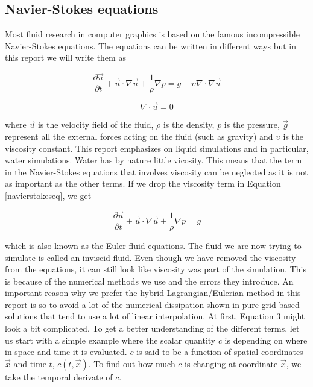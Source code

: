 \subsection{Navier-Stokes equations}

Most fluid research in computer graphics is based on the famous incompressible Navier-Stokes equations. The equations can be written in different ways but in this report we will write them as

\begin{equation}
\frac{\partial \vec{u}}{\partial t} + \vec{u} \cdot \nabla \vec{u} + \frac{1}{\rho}\nabla p = g + \upsilon \nabla \cdot \nabla \vec{u}
\label{navierstokeseq}
\end{equation}

\begin{equation}
\nabla \cdot \vec{u} = 0
\label{incompeq}
\end {equation}

where $\vec{u}$ is the velocity field of the fluid, $\rho$ is the density, $p$ is the pressure, $\vec{g}$ represent all the external forces acting on the fluid (such as gravity) and $\upsilon$ is the viscosity constant. This report emphasizes on liquid simulations and in particular, water simulations. Water has by nature little vicosity. This means that the term in the Navier-Stokes equations that involves viscosity can be neglected as it is not as important as the other terms. If we drop the viscosity term in Equation \ref{navierstokeseq}, we get

\begin{equation}
\frac{\partial \vec{u}}{\partial t} + \vec{u} \cdot \nabla \vec{u} + \frac{1}{\rho}\nabla p = g
\label{eulereq}
\end{equation}

which is also known as the Euler fluid equations. The fluid we are now trying to simulate is called an inviscid fluid. Even though we have removed the viscosity from the equations, it can still look like viscosity was part of the simulation. This is because of the numerical methods we use and the errors they introduce. An important reason why we prefer the hybrid Lagrangian/Eulerian method in this report is so to avoid a lot of the numerical dissipation shown in pure grid based solutions that tend to use a lot of linear interpolation. 
\newline
\newline
At first, Equation 3 might look a bit complicated. To get a better understanding of the different terms, let us start with a simple example where the scalar quantity $c$ is depending on where in space and time it is evaluated. $c$ is said to be a function of spatial coordinates $\vec{x}$ and time $t$, $c(t,\vec{x})$. To find out how much $c$ is changing at coordinate $\vec{x}$, we take the temporal derivate of $c$.

